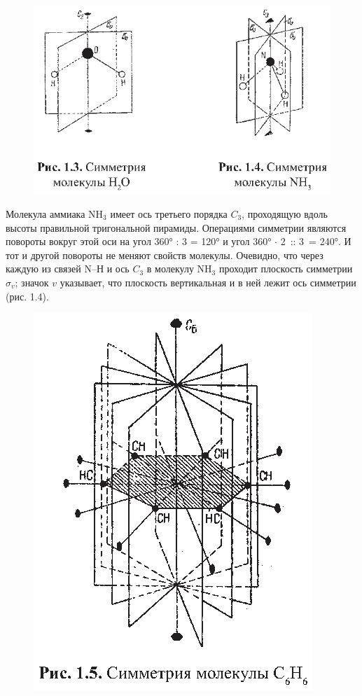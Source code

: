 \begin{figure}[tbp]
\centerline{\hbox{\includegraphics[scale=1]{Ris/ris_eps/ris1_03.eps}}}

\end{figure}
Молекула аммиака NH$_3$ имеет ось третьего порядка $C_3$, проходящую вдоль 
высоты правильной тригональной пирамиды. Операциями симметрии являются повороты 
вокруг этой оси на угол 360° : 3 = 120° и угол 360° $\cdot$ 2~:\linebreak : 3~= 240°. И тот 
и другой повороты не меняют свойств молекулы. Очевидно, что через каждую из связей 
N--Н и ось $C_3$ в молекулу NH$_3$ проходит плоскость симметрии $\sigma_v$; 
значок $v$ указывает, что плоскость вертикальная и в ней лежит ось симметрии (рис. 1.4).

\begin{figure}[tbp]
\centerline{\hbox{\includegraphics[scale=1]{Ris/ris_eps/ris1_05.eps}}}

\end{figure}

